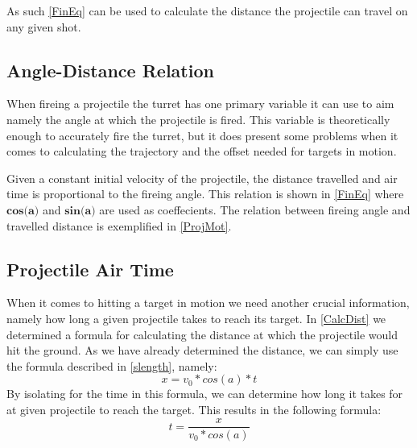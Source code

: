 As such \autoref{FinEq} can be used to calculate the distance the projectile can
travel on any given shot.

\subsection{Angle-Distance Relation}
When fireing a projectile the turret has one primary variable it can use to aim
namely the angle at which the projectile is fired. This variable is
theoretically enough to accurately fire the turret, but it does present some
problems when it comes to calculating the trajectory and the offset needed for
targets in motion.\nl

Given a constant initial velocity of the projectile, the distance travelled and
air time is proportional to the fireing angle. This relation is shown in
\autoref{FinEq} where $\textbf{cos(a)}$ and $\textbf{sin(a)}$ are used as
coeffecients. The relation between fireing angle and travelled distance is
exemplified in \autoref{ProjMot}.


\subsection{Projectile Air Time}
When it comes to hitting a target in motion we need another crucial information,
namely how long a given projectile takes to reach its target.
In \autoref{CalcDist} we determined a formula for calculating the distance at
which the projectile would hit the ground. As we have already determined the
distance, we can simply use the formula described in \autoref{slength}, namely:
\begin{equation}
x=v_0*cos(a)*t
\end{equation}
By isolating for the time in this formula, we can determine how long it takes
for at given projectile to reach the target. This results in the following
formula:
\begin{equation}\label{TimeEq}
t=\frac{x}{v_0*cos(a)}
\end{equation}



